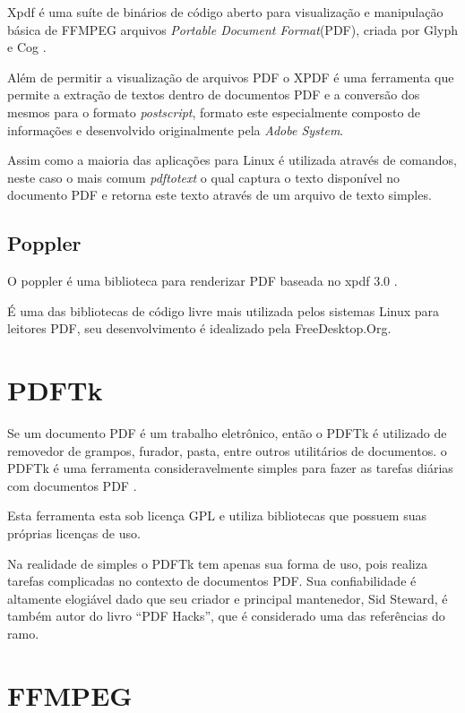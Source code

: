 Xpdf é uma suíte de binários de código aberto para visualização e manipulação básica de FFMPEG arquivos \textit{Portable Document Format}(PDF), criada por Glyph e Cog \cite{GLYPH-COG}.

Além de permitir a visualização de arquivos PDF o XPDF é uma ferramenta que permite a extração de textos dentro de documentos PDF e a conversão dos mesmos para o formato \textit{postscript}, formato este especialmente composto de informações e desenvolvido originalmente pela \textit{Adobe System}.

Assim como a maioria das aplicações para Linux é utilizada através de comandos, neste caso o mais comum \textit{pdftotext} o qual captura o texto disponível no documento PDF e retorna este texto através de um arquivo de texto simples.


\subsection{Poppler}

O poppler é uma biblioteca para renderizar PDF baseada no xpdf 3.0 \cite{JOHNSON}.

É uma das bibliotecas de código livre mais utilizada pelos sistemas Linux para leitores PDF, seu desenvolvimento é idealizado pela FreeDesktop.Org.


\section{PDFTk}

Se um documento PDF é um trabalho eletrônico, então o PDFTk é utilizado de removedor de grampos, furador, pasta, entre outros utilitários de documentos. o PDFTk é uma ferramenta consideravelmente simples para fazer as tarefas diárias com documentos PDF \cite{STEWARD}.

Esta ferramenta esta sob licença GPL e utiliza bibliotecas que possuem suas próprias licenças de uso.

Na realidade de simples o PDFTk tem apenas sua forma de uso, pois realiza tarefas complicadas no contexto de documentos PDF. Sua confiabilidade é altamente elogiável dado que seu criador e principal mantenedor, Sid Steward, é também autor do livro “PDF Hacks”, que é considerado uma das referências do ramo.


\section{FFMPEG}

